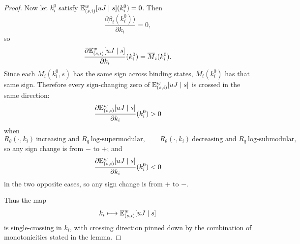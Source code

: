 \documentclass[master.tex]{subfiles}
\begin{document}
\begin{proof}
Now let $k_i^0$ satisfy $\mathbb{E}_{(s,i)}^w[uJ\mid s](k_i^0)=0$. Then
\[
\frac{\partial \beta_i(k_i^0))}{\partial k_i}=0,
\]
so
\[
\frac{\partial \mathbb{E}_{(s,i)}^w[uJ\mid s]}{\partial k_i}(k_i^0)=\overline M_i(k_i^0).
\]
Since each $M_i(k_i^0,s)$ has the same sign across binding states, $\overline M_i(k_i^0)$ has that same sign. Therefore every sign-changing zero of $\mathbb{E}_{(s,i)}^w[uJ\mid s]$ is crossed in the same direction:
\[
\frac{\partial \mathbb{E}_{(s,i)}^w[uJ\mid s]}{\partial k_i}(k_i^0)>0
\]
when
\[
R_\theta(\cdot,k_i)\ \text{increasing and }R_q\ \text{log-supermodular},
\qquad
R_\theta(\cdot,k_i)\ \text{decreasing and }R_q\ \text{log-submodular},
\]
so any sign change is from $-$ to $+$; and
\[
\frac{\partial \mathbb{E}_{(s,i)}^w[uJ\mid s]}{\partial k_i}(k_i^0)<0
\]
in the two opposite cases, so any sign change is from $+$ to $-$.

Thus the map
\[
k_i\longmapsto \mathbb{E}_{(s,i)}^w[uJ\mid s]
\]
is single-crossing in $k_i$, with crossing direction pinned down by the combination of monotonicities stated in the lemma.
\end{proof}


\end{document}
